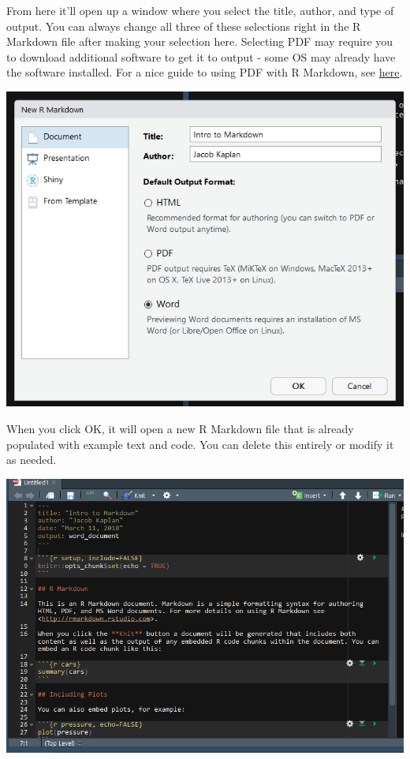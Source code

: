 \documentclass[
  12pt,
  openany]{book}
\begin{document}
From here it'll open up a window where you select the title, author, and type of output. You can always change all three of these selections right in the R Markdown file after making your selection here. Selecting PDF may require you to download additional software to get it to output - some OS may already have the software installed. For a nice guide to using PDF with R Markdown, see \href{https://medium.com/@sorenlind/create-pdf-.reports-using-r-r-markdown-latex-and-knitr-on-windows-10-952b0c48bfa9}{here}.

\includegraphics{images/markdown2.png}

When you click OK, it will open a new R Markdown file that is already populated with example text and code. You can delete this entirely or modify it as needed.

\includegraphics{images/markdown6.png}
\end{document}
